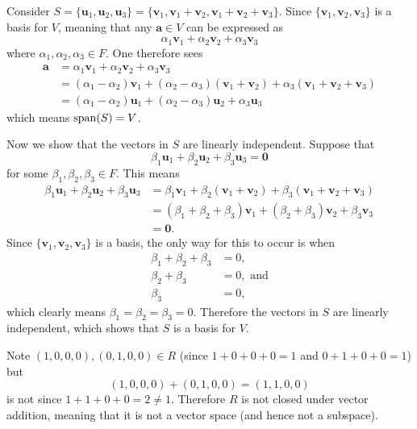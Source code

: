 \begin{questions}
    \item Consider $S = \{\textbf{u}_1, \textbf{u}_2, \textbf{u}_3\} = \{\textbf{v}_1, \textbf{v}_1 + \textbf{v}_2, \textbf{v}_1 + \textbf{v}_2 + \textbf{v}_3\}$. Since $\{\textbf{v}_1,\textbf{v}_2,\textbf{v}_3\}$ is a basis for $V$, meaning that any $\textbf{a} \in V$ can be expressed as
    \[
        \alpha_1\textbf{v}_1 + \alpha_2\textbf{v}_2 + \alpha_3\textbf{v}_3
    \]
    where $\alpha_1, \alpha_2, \alpha_3 \in F$. One therefore sees
    \begin{align*}
        \textbf{a} &= \alpha_1\textbf{v}_1 + \alpha_2\textbf{v}_2 + \alpha_3\textbf{v}_3\\
        &= (\alpha_1 - \alpha_2)\textbf{v}_1 + (\alpha_2 - \alpha_3)(\textbf{v}_1 + \textbf{v}_2) + \alpha_3(\textbf{v}_1 + \textbf{v}_2 + \textbf{v}_3)\\
        &= (\alpha_1 - \alpha_2)\textbf{u}_1 + (\alpha_2 - \alpha_3)\textbf{u}_2 + \alpha_3\textbf{u}_3
    \end{align*}
    which means $\mathrm{span}(S) = V$.

    Now we show that the vectors in $S$ are linearly independent. Suppose that
    \[
        \beta_1\textbf{u}_1 + \beta_2\textbf{u}_2 + \beta_3\textbf{u}_3 = \textbf{0}
    \]
    for some $\beta_1, \beta_2, \beta_3 \in F$. This means
    \begin{align*}
        \beta_1\textbf{u}_1 + \beta_2\textbf{u}_2 + \beta_3\textbf{u}_3 &= \beta_1\textbf{v}_1 + \beta_2(\textbf{v}_1 + \textbf{v}_2) + \beta_3(\textbf{v}_1 + \textbf{v}_2 + \textbf{v}_3)\\
        &= (\beta_1+\beta_2+\beta_3)\textbf{v}_1 + (\beta_2+\beta_3)\textbf{v}_2 + \beta_3\textbf{v}_3\\
        &= \textbf{0}.
    \end{align*}
    Since $\{\textbf{v}_1, \textbf{v}_2, \textbf{v}_3\}$ is a basis, the only way for this to occur is when
    \begin{align*}
        \beta_1 + \beta_2 + \beta_3 &= 0,\\
        \beta_2 + \beta_3 &= 0, \text{ and}\\
        \beta_3 & = 0,
    \end{align*}
    which clearly means $\beta_1 = \beta_2 = \beta_3 = 0$. Therefore the vectors in $S$ are linearly independent, which shows that $S$ is a basis for $V$.
    
    \item \begin{partquestions}{\alph*}
        \item Note $(1, 0, 0, 0), (0, 1, 0, 0) \in R$ (since $1 + 0 + 0 + 0 = 1$ and $0 + 1 + 0 + 0 = 1$) but
        \[
            (1, 0, 0, 0) + (0, 1, 0, 0) = (1, 1, 0, 0)
        \]
        is not since $1 + 1 + 0 + 0 = 2 \neq 1$. Therefore $R$ is not closed under vector addition, meaning that it is not a vector space (and hence not a subspace).
        

\end{partquestions}
\end{questions}
